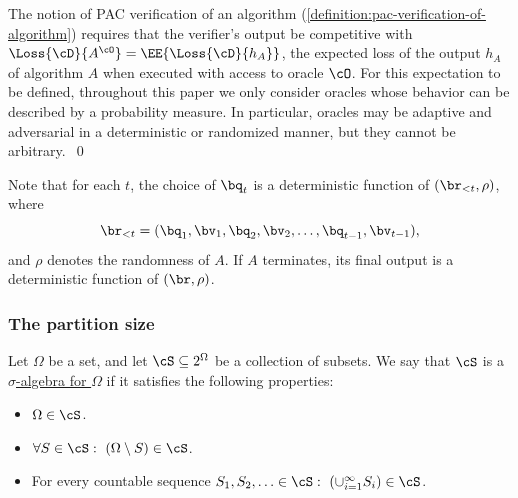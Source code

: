 \begin{remark}
	The notion of PAC verification of an algorithm (\cref{definition:pac-verification-of-algorithm}) requires that the verifier's output be competitive with $\Loss{\cD}{A^\cO} = \EE{\Loss{\cD}{h_A}}$, the expected loss of the output $h_A$ of algorithm $A$ when executed with access to oracle $\cO$. For this expectation to be defined, throughout this paper we only consider oracles whose behavior can be described by a probability measure. In particular, oracles may be adaptive and adversarial in a deterministic or randomized manner, but they cannot be arbitrary.~\qed
\end{remark}


Note that for each $t$, the choice of $\bq_t$ is a deterministic function of $(\br_{< t},\rho)$, where 
\[
	\br_{< t} = (\bq_1,\bv_1,\bq_2,\bv_2,\dots,\bq_{t-1},\bv_{t-1}),
\]
and $\rho$ denotes the randomness of $A$. If $A$ terminates, its final output is a deterministic function of $(\br,\rho)$.

\subsubsection{The partition size}

\begin{definition}
	Let $\Omega$ be a set, and let $\cS \subseteq 2^\Omega$ be a collection of subsets. We say that $\cS$ is a \ul{$\sigma$-algebra for $\Omega$} if it satisfies the following properties:
	\begin{itemize}
		\item{$\Omega \in \cS$.}
		\item{$\forall S \in \cS: ~ (\Omega \setminus S) \in \cS$.}
		\item{For every countable sequence $S_1,S_2,\ldots \in \cS: ~ \left(\cup_{i=1}^\infty S_i\right) \in \cS$.}
	\end{itemize}
\end{definition}

